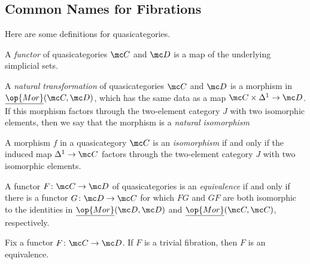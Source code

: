\documentclass[../notes.tex]{subfiles}
\begin{document}
\subsection{Common Names for Fibrations}
Here are some definitions for quasicategories.
\begin{definition}[functor]
	A \textit{functor} of quasicategories $\mc C$ and $\mc D$ is a map of the underlying simplicial sets.
\end{definition}
\begin{definition}
	A \textit{natural transformation} of quasicategories $\mc C$ and $\mc D$ is a morphism in $\underline{\op{Mor}}(\mc C,\mc D)$, which has the same data as a map $\mc C\times\Delta^1\to\mc D$. If this morphism factors through the two-element category $J$ with two isomorphic elements, then we say that the morphism is a \textit{natural isomorphism}
\end{definition}
\begin{definition}[isomorphism]
	A morphism $f$ in a quasicategory $\mc C$ is an \textit{isomorphism} if and only if the induced map $\Delta^1\to\mc C$ factors through the two-element category $J$ with two isomorphic elements.
\end{definition}
\begin{definition}[equivalence]
	A functor $F\colon\mc C\to\mc D$ of quasicategories is an \textit{equivalence} if and only if there is a functor $G\colon\mc D\to\mc C$ for which $FG$ and $GF$ are both isomorphic to the identities in $\underline{\op{Mor}}(\mc D,\mc D)$ and $\underline{\op{Mor}}(\mc C,\mc C)$, respectively. %
\end{definition}
\begin{proposition} \label{prop:triv-fibration-to-equiv}
	Fix a functor $F\colon\mc C\to\mc D$. If $F$ is a trivial fibration, then $F$ is an equivalence.
\end{proposition}
\end{document}
